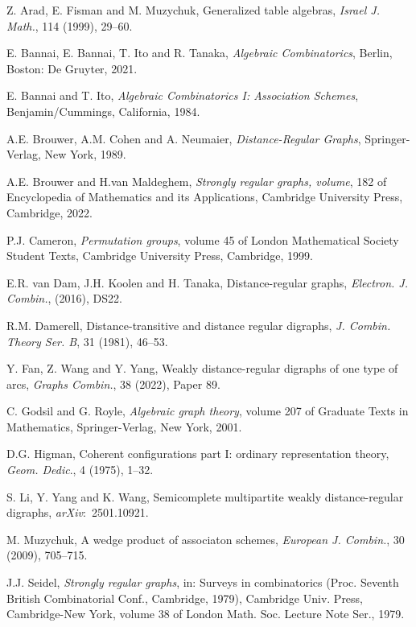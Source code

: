 \documentclass[12pt,a4paper]{amsart}
\theoremstyle{definition}
\begin{document}
\begin{thebibliography}{00}
 Z. Arad, E. Fisman and M. Muzychuk, Generalized table algebras,
\textit{Israel J. Math.}, 114 (1999), 29--60.

 E. Bannai, E. Bannai, T. Ito and R. Tanaka, \textit{Algebraic Combinatorics}, Berlin, Boston: De Gruyter, 2021.

 E. Bannai and T. Ito, \textit{Algebraic Combinatorics I: Association Schemes}, Benjamin/Cummings, California, 1984.

 A.E. Brouwer, A.M. Cohen and A. Neumaier,
\textit{Distance-Regular Graphs}, Springer-Verlag, New York, 1989.

 A.E. Brouwer and H.van Maldeghem, \textit{Strongly regular graphs, volume}, 182 of Encyclopedia of Mathematics and its Applications, Cambridge University Press, Cambridge, 2022.

 P.J. Cameron, \textit{Permutation groups}, volume 45 of London Mathematical Society Student Texts, Cambridge University Press, Cambridge, 1999.

 E.R. van Dam, J.H. Koolen and H. Tanaka, Distance-regular graphs,
\textit{Electron. J. Combin.}, (2016), DS22.

 R.M. Damerell, Distance-transitive and distance regular digraphs, \textit{J. Combin. Theory Ser. B}, 31 (1981), 46--53.

 Y. Fan, Z. Wang and Y. Yang, Weakly distance-regular digraphs of one type of arcs, \textit{Graphs Combin.}, 38 (2022), Paper 89.
	
 C. Godsil and G. Royle, \textit{Algebraic graph theory}, volume 207 of Graduate Texts in Mathematics, Springer-Verlag, New York, 2001.

 D.G. Higman, Coherent configurations part I: ordinary representation theory, \textit{Geom. Dedic}., 4 (1975), 1--32.

 S. Li, Y. Yang and K. Wang, Semicomplete multipartite weakly distance-regular digraphs, \textit{arXiv}:~2501.10921.
	
 M. Muzychuk, A wedge product of associaton schemes, \textit{European J. Combin.}, 30 (2009), 705--715.

 J.J. Seidel, \textit{Strongly regular graphs},  in: Surveys in combinatorics (Proc. Seventh British Combinatorial Conf., Cambridge, 1979), Cambridge Univ. Press, Cambridge-New York, volume 38 of London Math. Soc. Lecture Note Ser., 1979.
	

\end{thebibliography}
\end{document}
